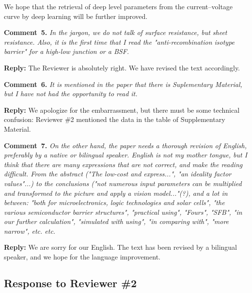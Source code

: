 \documentclass[num-refs]{wiley-article} %
\begin{document}
We hope that the  retrieval of deep level parameters
from the current--voltage curve by deep learning
will be further improved.


\vspace{1cm}
\noindent
\textcolor[rgb]{0.00,0.50,1.00}{\textbf{Comment~5.}}
\emph{In the jargon, we do not talk of surface resistance, but sheet resistance.
Also, it is the first time that I read the "anti-recombination isotype barrier" for a high-low junction or a BSF.}

\vspace{0.5cm}
\noindent
\textcolor[rgb]{0.51,0.00,0.00}{\textbf{Reply:}}
The Reviewer is absolutely right.
We have revised the text accordingly.

\vspace{1cm}
\noindent
\textcolor[rgb]{0.00,0.50,1.00}{\textbf{Comment~6.}}
\emph{It is mentioned in the paper that there is Suplementary Material, but I have not had the opportunity to read it.}

\vspace{0.5cm}
\noindent
\textcolor[rgb]{0.51,0.00,0.00}{\textbf{Reply:}}
We apologize for the embarrassment, but there must be some technical confusion:
Reviewer \#2 mentioned the data in the table of Supplementary Material.

\vspace{1cm}
\noindent
\textcolor[rgb]{0.00,0.50,1.00}{\textbf{Comment~7.}}
\emph{On the other hand, the paper needs a thorough revision of English, preferably by a native or bilingual speaker.
English is not my mother tongue, but I think that there are many expressions that are not correct, and make the reading difficult.
From the abstract ("The low-cost and express...", "an ideality factor values"...)
to the conclusions ("not numerous input parameters can be multiplied and transformed to the picture and apply a vision model..."(?),
and a lot in between: "both for microelectronics, logic technologies and solar cells",
"the various semiconductor barrier structures", "practical using", "Fours", "SFB", "in our further calculation",
"simulated with using", "in comparing with", "more narrow", etc. etc. }

\vspace{0.5cm}
\noindent
\textcolor[rgb]{0.51,0.00,0.00}{\textbf{Reply:}}
We are sorry for our English.
The text has been revised by a bilingual speaker, and we hope for the language improvement.


\subsection*{Response to Reviewer \#2 }
\end{document}
